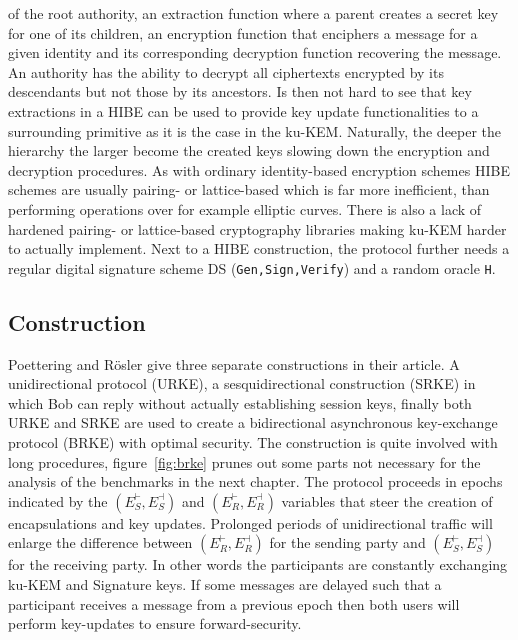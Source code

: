 \documentclass[11pt,a4paper,twoside,openright,bibliography=totoc]{scrbook}
\begin{document}
of the root authority, an extraction function where a parent creates
a secret key for one of its children, an encryption
function that enciphers a message for a given identity and
its corresponding decryption function recovering the message.
An authority has the ability to decrypt all ciphertexts
encrypted by its descendants but not those by its ancestors.
Is then not hard to see that key extractions in a HIBE
can be used to provide key update functionalities to
a surrounding primitive as it is the case in the ku-KEM.
Naturally, the deeper the hierarchy the larger become the
created keys slowing down the encryption and decryption procedures.
As with ordinary identity-based encryption schemes HIBE schemes are usually
pairing- or lattice-based which is far more inefficient,
than performing operations over for example elliptic curves.
There is also a lack of hardened pairing- or lattice-based
cryptography libraries making ku-KEM harder to actually
implement.
Next to a HIBE construction, the protocol further needs a regular digital
signature scheme DS (\texttt{Gen,Sign,Verify}) and a random oracle \texttt{H}.

\subsection{Construction}
\label{sec:construction}

Poettering and Rösler give three separate constructions in their article.
A unidirectional protocol (URKE), a sesquidirectional construction (SRKE) in which
Bob can reply without actually establishing session keys, finally both URKE and SRKE
are used to create a bidirectional asynchronous key-exchange protocol (BRKE)
with optimal security. The construction is quite involved with long
procedures, figure~\ref{fig:brke} prunes out some parts not necessary for the
analysis of the benchmarks in the next chapter. The protocol proceeds
in epochs indicated by the $(E_S^\vdash,E_S^\dashv)$ and $(E_R^\vdash,E_R^\dashv)$
variables that steer the creation of encapsulations and key updates.
Prolonged periods of unidirectional traffic will enlarge the
difference between $(E_R^\vdash,E_R^\dashv)$ for the sending
party and $(E_S^\vdash,E_S^\dashv)$ for the receiving party.
In other words the participants are constantly exchanging
ku-KEM and Signature keys. If some messages are delayed such
that a participant receives a message from a previous epoch
then both users will perform key-updates to ensure forward-security.
\end{document}
